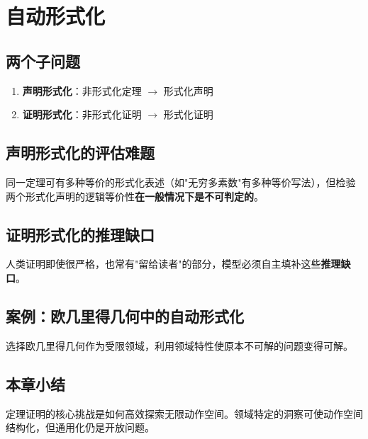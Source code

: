 \section{自动形式化}

\subsection{两个子问题}

\begin{enumerate}
    \item \textbf{声明形式化}：非形式化定理 $\to$ 形式化声明
    \item \textbf{证明形式化}：非形式化证明 $\to$ 形式化证明
\end{enumerate}

\subsection{声明形式化的评估难题}

同一定理可有多种等价的形式化表述（如"无穷多素数"有多种等价写法），但检验两个形式化声明的逻辑等价性\textbf{在一般情况下是不可判定的}。

\subsection{证明形式化的推理缺口}

人类证明即使很严格，也常有"留给读者"的部分，模型必须自主填补这些\textbf{推理缺口}。

\subsection{案例：欧几里得几何中的自动形式化}

选择欧几里得几何作为受限领域，利用领域特性使原本不可解的问题变得可解。

\subsection{本章小结}

定理证明的核心挑战是如何高效探索无限动作空间。领域特定的洞察可使动作空间结构化，但通用化仍是开放问题。

